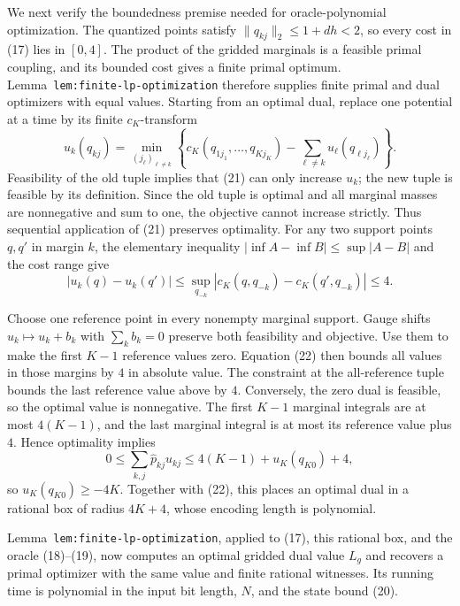 We next verify the boundedness premise needed for oracle-polynomial optimization. The quantized points satisfy \(\|q_{kj}\|_2\le1+dh<2\), so every cost in (17) lies in \([0,4]\). The product of the gridded marginals is a feasible primal coupling, and its bounded cost gives a finite primal optimum. Lemma~\texttt{lem:finite-lp-optimization} therefore supplies finite primal and dual optimizers with equal values. Starting from an optimal dual, replace one potential at a time by its finite \(c_K\)-transform
\[
u_k(q_{kj})
=\min_{(j_\ell)_{\ell\ne k}}
\left\{c_K(q_{1j_1},\ldots,q_{Kj_K})-
\sum_{\ell\ne k}u_\ell(q_{\ell j_\ell})\right\}.
\tag{21}
\]
Feasibility of the old tuple implies that (21) can only increase \(u_k\); the new tuple is feasible by its definition. Since the old tuple is optimal and all marginal masses are nonnegative and sum to one, the objective cannot increase strictly. Thus sequential application of (21) preserves optimality. For any two support points \(q,q'\) in margin \(k\), the elementary inequality \(|\inf A-\inf B|\le\sup|A-B|\) and the cost range give
\[
|u_k(q)-u_k(q')|
\le\sup_{q_{-k}}|c_K(q,q_{-k})-c_K(q',q_{-k})|
\le4.
\tag{22}
\]

Choose one reference point in every nonempty marginal support. Gauge shifts \(u_k\mapsto u_k+b_k\) with \(\sum_kb_k=0\) preserve both feasibility and objective. Use them to make the first \(K-1\) reference values zero. Equation (22) then bounds all values in those margins by \(4\) in absolute value. The constraint at the all-reference tuple bounds the last reference value above by \(4\). Conversely, the zero dual is feasible, so the optimal value is nonnegative. The first \(K-1\) marginal integrals are at most \(4(K-1)\), and the last marginal integral is at most its reference value plus \(4\). Hence optimality implies
\[
0\le\sum_{k,j}\widehat p_{kj}u_{kj}
\le4(K-1)+u_K(q_{K0})+4,
\]
so \(u_K(q_{K0})\ge-4K\). Together with (22), this places an optimal dual in a rational box of radius \(4K+4\), whose encoding length is polynomial.

Lemma~\texttt{lem:finite-lp-optimization}, applied to (17), this rational box, and the oracle (18)--(19), now computes an optimal gridded dual value \(L_g\) and recovers a primal optimizer with the same value and finite rational witnesses. Its running time is polynomial in the input bit length, \(N\), and the state bound (20).

